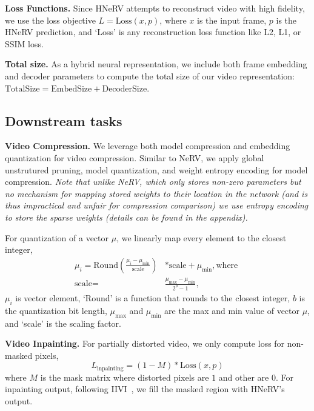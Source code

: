 \documentclass[10pt,twocolumn,letterpaper]{article}
\begin{document}
\noindent\textbf{Loss Functions.}
Since HNeRV attempts to reconstruct video with high fidelity, we use the loss objective
$L = \text{Loss}(x, p)$,
where $x$ is the input frame, $p$ is the HNeRV prediction, and `Loss' is any reconstruction loss function like L2, L1, or SSIM loss.

\noindent\textbf{Total size.}
As a hybrid neural representation, we include both frame embedding and decoder parameters to compute the total size of our video representation:
$\text{TotalSize} = \text{EmbedSize} + \text{DecoderSize}$.

\subsection{Downstream tasks}
\label{sec:downstream-task}

\noindent\textbf{Video Compression.}
We leverage both model compression and embedding quantization for video compression. 
Similar to NeRV, we apply global unstrutured pruning, model quantization, and weight entropy encoding for model compression. 
\textit{Note that unlike NeRV, which only stores non-zero parameters but no mechanism for mapping stored weights to their location in the network (and is thus impractical and unfair for compression comparison) we use entropy encoding to store the sparse weights (details can be found in the appendix). 
}

For quantization of a vector $\mu$, we linearly map every element to the closest integer,
\begin{equation}
  \begin{aligned}
    \mu_i = \text{Round}\left(\frac{\mu_i - \mu_\text{min}}{\text{scale}}\right) &* \text{scale} + \mu_\text{min} , \text{where } \\
    \text{scale} = & \frac{\mu_\text{max} - \mu_\text{min}}{2^{b} - 1} ,
    \label{equa:quant}
  \end{aligned}
\end{equation}
$\mu_{i}$ is vector element, `Round' is a function that rounds to the closest integer, $b$ is the quantization bit length, $\mu_\text{max}$ and $\mu_\text{min}$ are the max and min value of vector $\mu$, and `scale' is the scaling factor.

\noindent\textbf{Video Inpainting.} 
For partially distorted video, we only compute loss for non-masked pixels, 
\begin{equation}
    L_\text{inpainting} = (1 - M) * \text{Loss}(x, p)
    \label{equa:inpaint-loss}
\end{equation}
where $M$ is the mask matrix where distorted pixels are $1$ and other are $0$. 
For inpainting output, following IIVI~\cite{ouyang2021video}, we fill the masked region with HNeRV's output.
\end{document}

